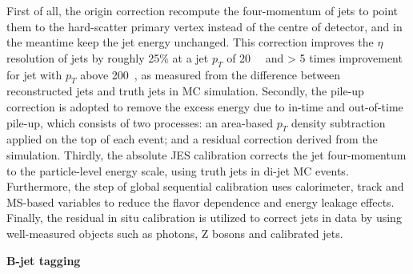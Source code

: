 First of all, the origin correction recompute the four-momentum of jets to point them to the hard-scatter primary vertex instead of the centre of detector, and in the meantime keep the jet energy unchanged.
This correction improves the $\eta$ resolution of jets by roughly 25\% at a jet $p_{T}$ of 20~\gev~ and > 5 times improvement for jet with $p_{T}$ above 200~\gev, 
as measured from the difference between reconstructed jets and truth jets in MC simulation.
Secondly, the pile-up correction is adopted to remove the excess energy due to in-time and out-of-time pile-up,
which consists of two processes: an area-based $p_{T}$ density subtraction applied on the top of each event; and a residual correction derived from the simulation.
Thirdly, the absolute JES calibration corrects the jet four-momentum to the particle-level energy scale, using truth jets in di-jet MC events.
Furthermore, the step of global sequential calibration uses calorimeter, track and MS-based variables to reduce the flavor dependence and energy leakage effects.
Finally, the residual in situ calibration is utilized to correct jets in data by using well-measured objects such as photons, Z bosons and calibrated jets.

\textbf{B-jet tagging}

